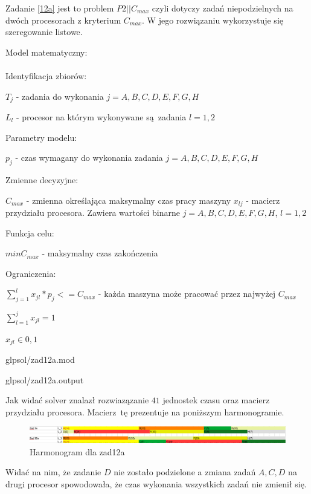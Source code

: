 \documentclass{article}
\begin{document}
Zadanie \ref{12a} jest to problem $P2||C_{max}$ czyli dotyczy zadań niepodzielnych na dwóch procesorach z kryterium $C_{max}$. W jego rozwiązaniu wykorzystuje się szeregowanie listowe.

\noindent Model matematyczny: \\\\

\noindent Identyfikacja zbiorów:

$T_j$ - zadania do wykonania $j = {A,B,C,D,E,F,G,H}$

$L_{l}$ - procesor na którym wykonywane są zadania $l = {1,2}$

\noindent Parametry modelu:

$p_{j}$ - czas wymagany do wykonania zadania $j = {A,B,C,D,E,F,G,H}$

\noindent Zmienne decyzyjne:

$C_{max}$ - zmienna określająca maksymalny czas pracy maszyny
$x_{lj}$ - macierz przydziału procesora. Zawiera wartości binarne $j = {A,B,C,D,E,F,G,H}$, $l = {1,2}$ 

\noindent Funkcja celu:

$min C_{max}$ - maksymalny czas zakończenia

\noindent Ograniczenia:

$\sum^{l}_{j = 1} x_{jl} * p_j <= C_{max}$ - każda maszyna może pracować przez najwyżej $C_{max}$

$\sum^{j}_{l = 1} x_{jl} = 1$

$x_{jl} \in {0,1}$


{glpsol/zad12a.mod}


{glpsol/zad12a.output}

Jak widać solver znalazł rozwiazązanie $41$ jednostek czasu oraz macierz przydziału procesora. Macierz tę prezentuje na poniższym harmonogramie.

\begin{figure}[h]    
  \centering    
  \includegraphics[width=\linewidth]{others/zad12a_harmonogram.png}
  \caption{Harmonogram dla zad12a}
\end{figure}

Widać na nim, że zadanie $D$ nie zostało podzielone a zmiana zadań $A, C, D$ na drugi procesor spowodowała, że czas
wykonania wszystkich zadań nie zmienił się.
\end{document}
